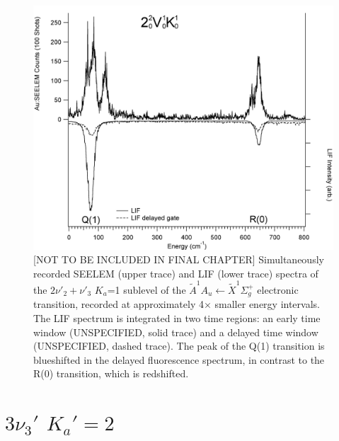 \documentclass[12pt]{mitthesis}
\begin{document}
\begin{figure}
  \caption{[NOT TO BE INCLUDED IN FINAL CHAPTER] Simultaneously
    recorded SEELEM (upper trace) and LIF (lower trace) spectra of the
    $2\nu'_2+\nu'_3$ $K_a$=1 sublevel of the $\tilde{A}^1A_u \leftarrow
    \tilde{X} ^1\Sigma_g^+$ electronic transition, recorded at
    approximately 4$\times$ smaller energy intervals.  The LIF
    spectrum is integrated in two time regions: an early time window
    (UNSPECIFIED, solid trace) and a delayed time window (UNSPECIFIED,
    dashed trace).  The peak of the Q(1) transition is blueshifted in
    the delayed fluorescence spectrum, in contrast to the R(0)
    transition, which is redshifted.}
  \label{fig:spectrum-2231-q1r0}
  \centering
  \vspace{1cm}
  \includegraphics[width=6in]{spectrum-2231-Q1R0.png}
\end{figure}

\section{$3\nu_3'$ $K_a'\!=\!2$}
\end{document}
